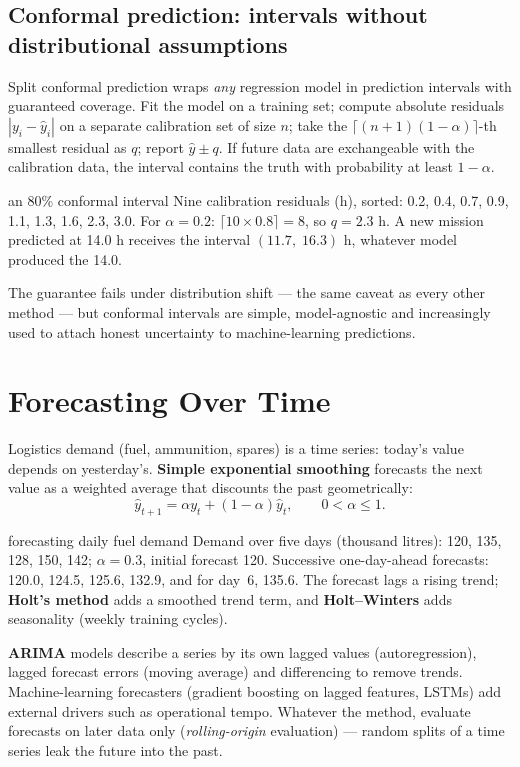 \documentclass[11pt]{article}
\begin{document}
\subsection{Conformal prediction: intervals without distributional assumptions}
Split conformal prediction wraps \emph{any} regression model in prediction intervals with guaranteed coverage. Fit the model on a training set; compute absolute residuals $|y_i-\hat y_i|$ on a separate calibration set of size $n$; take the $\lceil(n+1)(1-\alpha)\rceil$-th smallest residual as $q$; report $\hat y\pm q$. If future data are exchangeable with the calibration data, the interval contains the truth with probability at least $1-\alpha$.
\begin{example}{an 80\% conformal interval}
Nine calibration residuals (h), sorted: 0.2, 0.4, 0.7, 0.9, 1.1, 1.3, 1.6, 2.3, 3.0. For $\alpha=0.2$: $\lceil10\times0.8\rceil=8$, so $q=2.3$ h. A new mission predicted at 14.0 h receives the interval $(11.7,\;16.3)$ h, whatever model produced the 14.0.
\end{example}
The guarantee fails under distribution shift --- the same caveat as every other method --- but conformal intervals are simple, model-agnostic and increasingly used to attach honest uncertainty to machine-learning predictions.

\section{Forecasting Over Time}
Logistics demand (fuel, ammunition, spares) is a time series: today's value depends on yesterday's. \textbf{Simple exponential smoothing} forecasts the next value as a weighted average that discounts the past geometrically:
\[\hat y_{t+1}=\alpha y_t+(1-\alpha)\hat y_t,\qquad0<\alpha\le1.\]
\begin{example}{forecasting daily fuel demand}
Demand over five days (thousand litres): 120, 135, 128, 150, 142; $\alpha=0.3$, initial forecast 120. Successive one-day-ahead forecasts: 120.0, 124.5, 125.6, 132.9, and for day~6, 135.6. The forecast lags a rising trend; \textbf{Holt's method} adds a smoothed trend term, and \textbf{Holt--Winters} adds seasonality (weekly training cycles).
\end{example}
\textbf{ARIMA} models describe a series by its own lagged values (autoregression), lagged forecast errors (moving average) and differencing to remove trends. Machine-learning forecasters (gradient boosting on lagged features, LSTMs) add external drivers such as operational tempo. Whatever the method, evaluate forecasts on later data only (\emph{rolling-origin} evaluation) --- random splits of a time series leak the future into the past.
\end{document}
